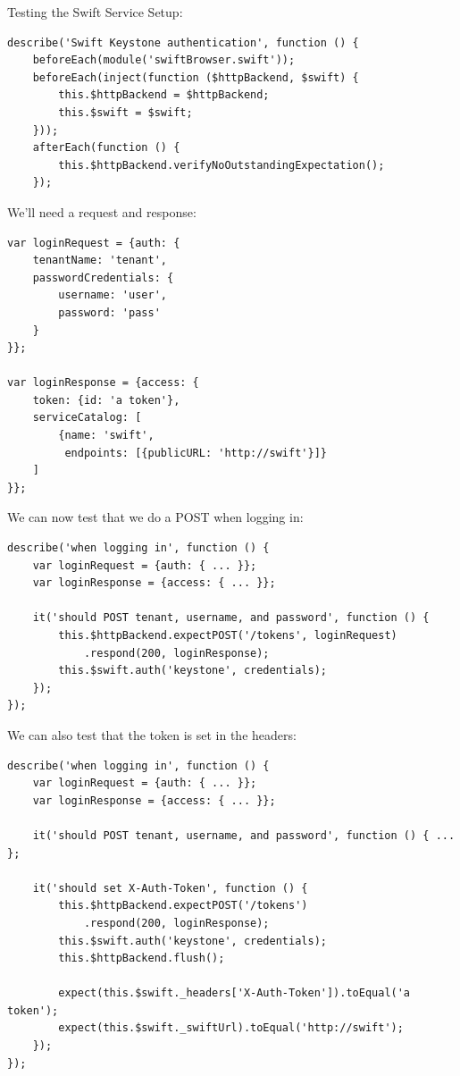 \documentclass[t,noamsthm]{beamer}
\begin{document}
\begin{frame}{Testing the Swift Service}
Setup:
\begin{lstlisting}
describe('Swift Keystone authentication', function () {
    beforeEach(module('swiftBrowser.swift'));
    beforeEach(inject(function ($httpBackend, $swift) {
        this.$httpBackend = $httpBackend;
        this.$swift = $swift;
    }));
    afterEach(function () {
        this.$httpBackend.verifyNoOutstandingExpectation();
    });
\end{lstlisting}
\framebreak

We'll need a request and response:
\begin{lstlisting}
var loginRequest = {auth: {
    tenantName: 'tenant',
    passwordCredentials: {
        username: 'user',
        password: 'pass'
    }
}};

var loginResponse = {access: {
    token: {id: 'a token'},
    serviceCatalog: [
        {name: 'swift',
         endpoints: [{publicURL: 'http://swift'}]}
    ]
}};
\end{lstlisting}

\framebreak

We can now test that we do a POST when logging in:
\begin{lstlisting}
describe('when logging in', function () {
    var loginRequest = {auth: { ... }};
    var loginResponse = {access: { ... }};

    it('should POST tenant, username, and password', function () {
        this.$httpBackend.expectPOST('/tokens', loginRequest)
            .respond(200, loginResponse);
        this.$swift.auth('keystone', credentials);
    });
});
\end{lstlisting}

\framebreak

We can also test that the token is set in the headers:
\begin{lstlisting}
describe('when logging in', function () {
    var loginRequest = {auth: { ... }};
    var loginResponse = {access: { ... }};

    it('should POST tenant, username, and password', function () { ... };

    it('should set X-Auth-Token', function () {
        this.$httpBackend.expectPOST('/tokens')
            .respond(200, loginResponse);
        this.$swift.auth('keystone', credentials);
        this.$httpBackend.flush();

        expect(this.$swift._headers['X-Auth-Token']).toEqual('a token');
        expect(this.$swift._swiftUrl).toEqual('http://swift');
    });
});
\end{lstlisting}    
\end{frame}
\end{document}
